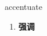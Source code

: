 
\begin{frame}
{\huge accentuate}
\begin{center}
\begin{enumerate}\Large
  \item \textbf{强调}
\end{enumerate}
\end{center}
\end{frame}
